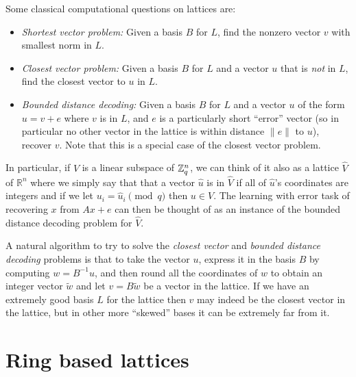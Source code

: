 Some classical computational questions on lattices are:

\begin{itemize}
\item
  \emph{Shortest vector problem:} Given a basis \(B\) for \(L\), find
  the nonzero vector \(v\) with smallest norm in \(L\).
\item
  \emph{Closest vector problem:} Given a basis \(B\) for \(L\) and a
  vector \(u\) that is \emph{not} in \(L\), find the closest vector to
  \(u\) in \(L\).
\item
  \emph{Bounded distance decoding:} Given a basis \(B\) for \(L\) and a
  vector \(u\) of the form \(u=v+e\) where \(v\) is in \(L\), and \(e\)
  is a particularly short ``error'' vector (so in particular no other
  vector in the lattice is within distance \(\|e\|\) to \(u\)), recover
  \(v\). Note that this is a special case of the closest vector problem.
\end{itemize}

In particular, if \(V\) is a linear subspace of \({\mathbb{Z}}_q^n\), we can think
of it also as a lattice \(\hat{V}\) of \(\mathbb{R}^n\) where we simply
say that that a vector \(\hat{u}\) is in \(\hat{V}\) if all of
\(\hat{u}\)'s coordinates are integers and if we let
\(u_i = \hat{u}_i \pmod{q}\) then \(u\in V\). The learning with error
task of recovering \(x\) from \(Ax+e\) can then be thought of as an
instance of the bounded distance decoding problem for \(\hat{V}\).

A natural algorithm to try to solve the \emph{closest vector} and
\emph{bounded distance decoding} problems is that to take the vector
\(u\), express it in the basis \(B\) by computing \(w = B^{-1}u\), and
then round all the coordinates of \(w\) to obtain an integer vector
\(\tilde{w}\) and let \(v=B\tilde{w}\) be a vector in the lattice. If we
have an extremely good basis \(L\) for the lattice then \(v\) may indeed
be the closest vector in the lattice, but in other more ``skewed'' bases
it can be extremely far from it.

\section{Ring based lattices}\label{11-Ring-based-lattices}

